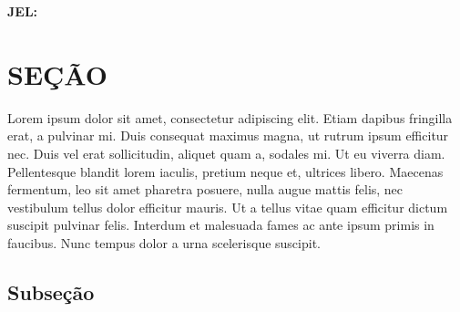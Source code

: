 \documentclass[
  12pt,
  a4paper,
]{template/td}
\begin{document}
\makeatletter
\textbf{JEL:} \@tdjel
\makeatother

\newpage{}

\section{SEÇÃO}

Lorem ipsum dolor sit amet, consectetur adipiscing elit. Etiam dapibus
fringilla erat, a pulvinar mi. Duis consequat maximus magna, ut rutrum
ipsum efficitur nec. Duis vel erat sollicitudin, aliquet quam a, sodales
mi. Ut eu viverra diam. Pellentesque blandit lorem iaculis, pretium
neque et, ultrices libero. Maecenas fermentum, leo sit amet pharetra
posuere, nulla augue mattis felis, nec vestibulum tellus dolor efficitur
mauris. Ut a tellus vitae quam efficitur dictum suscipit pulvinar felis.
Interdum et malesuada fames ac ante ipsum primis in faucibus. Nunc
tempus dolor a urna scelerisque suscipit.

\citep{nome2023} %
\citet{nome2023} %

\subsection{Subseção}
\end{document}
